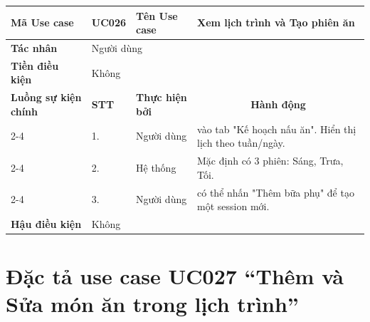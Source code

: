 \begin{longtable}{|p{2.7cm}|p{0.8cm}|p{2.6cm}|p{7.3cm}|}
\hline
\cellcolor[HTML]{D5F5E3}\textbf{Mã Use case} & \multicolumn{1}{l|}{UC026} & \cellcolor[HTML]{D5F5E3}\textbf{Tên Use case} & Xem lịch trình và Tạo phiên ăn \\ \hline
\cellcolor[HTML]{D5F5E3}\textbf{Tác nhân} & \multicolumn{3}{p{10.7cm}|}{Người dùng} \\ \hline
\cellcolor[HTML]{D5F5E3}\textbf{Tiền điều kiện} & \multicolumn{3}{p{10.7cm}|}{Không} \\ \hline

\cellcolor[HTML]{D5F5E3}\textbf{Luồng sự kiện chính} & \cellcolor[HTML]{FDEBD0}\textbf{STT} & \cellcolor[HTML]{FDEBD0}\textbf{Thực hiện bởi} & \multicolumn{1}{c|}{\cellcolor[HTML]{FDEBD0}\textbf{Hành động}} \\ \cline{2-4} 
\cellcolor[HTML]{D5F5E3} & 1. & Người dùng & vào tab "Kế hoạch nấu ăn". Hiển thị lịch theo tuần/ngày. \\ \cline{2-4} 
\cellcolor[HTML]{D5F5E3} & 2. & Hệ thống & Mặc định có 3 phiên: Sáng, Trưa, Tối. \\ \cline{2-4} 
\cellcolor[HTML]{D5F5E3} & 3. & Người dùng & có thể nhấn "Thêm bữa phụ" để tạo một session mới. \\ \hline

\cellcolor[HTML]{D5F5E3}\textbf{Hậu điều kiện} & \multicolumn{3}{p{10.7cm}|}{Không} \\ \hline
\end{longtable}
\endgroup

\section{Đặc tả use case UC027 ``Thêm và Sửa món ăn trong lịch trình''}
\vspace{0.5cm}

\begingroup
\renewcommand{\arraystretch}{1.5}

